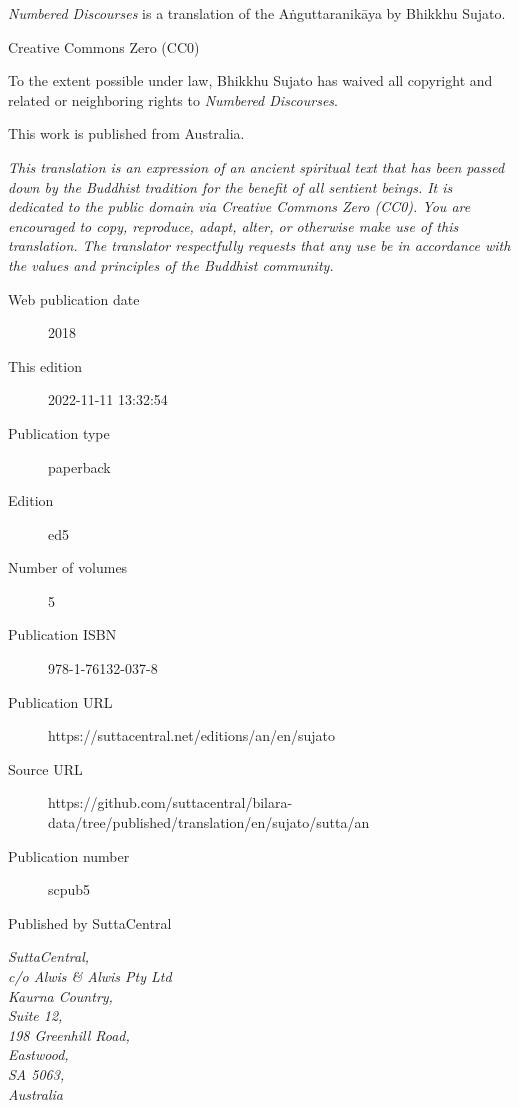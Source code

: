 \documentclass[12pt,openany]{book}%
\begin{document}
\begin{footnotesize}

\textit{Numbered Discourses} is a translation of the Aṅguttaranikāya by Bhikkhu Sujato.

\medskip

Creative Commons Zero (CC0)

To the extent possible under law, Bhikkhu Sujato has waived all copyright and related or neighboring rights to \textit{Numbered Discourses}.

\medskip

This work is published from Australia.

\begin{center}
\textit{This translation is an expression of an ancient spiritual text that has been passed down by the Buddhist tradition for the benefit of all sentient beings. It is dedicated to the public domain via Creative Commons Zero (CC0). You are encouraged to copy, reproduce, adapt, alter, or otherwise make use of this translation. The translator respectfully requests that any use be in accordance with the values and principles of the Buddhist community.}
\end{center}

\medskip

\begin{description}
    \item[Web publication date] 2018
    \item[This edition] 2022-11-11 13:32:54
    \item[Publication type] paperback
    \item[Edition] ed5
    \item[Number of volumes] 5
    \item[Publication ISBN] 978-1-76132-037-8
    \item[Publication URL] https://suttacentral.net/editions/an/en/sujato
    \item[Source URL] https://github.com/suttacentral/bilara-data/tree/published/translation/en/sujato/sutta/an
    \item[Publication number] scpub5
\end{description}

\medskip

Published by SuttaCentral

\medskip

\textit{SuttaCentral,\\
c/o Alwis \& Alwis Pty Ltd\\
Kaurna Country,\\
Suite 12,\\
198 Greenhill Road,\\
Eastwood,\\
SA 5063,\\
Australia}

\end{footnotesize}
\end{document}
